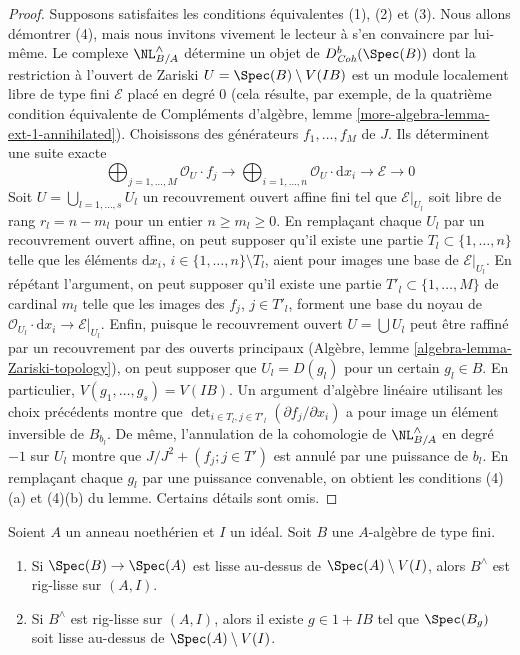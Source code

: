\begin{proof}
\medskip\noindent
Supposons satisfaites les conditions équivalentes (1), (2) et (3). Nous allons
démontrer (4), mais nous invitons vivement le lecteur à s'en convaincre par
lui-même. Le complexe $\NL_{B/A}^\wedge$ détermine un objet de
$D^b_{\textit{Coh}}(\Spec(B))$ dont la restriction à l'ouvert de Zariski
$U = \Spec(B) \setminus V(IB)$ est un module localement libre de type fini
$\mathcal{E}$ placé en degré $0$ (cela résulte, par exemple, de la quatrième
condition équivalente de Compléments d'algèbre, lemme
\ref{more-algebra-lemma-ext-1-annihilated}). Choisissons des générateurs
$f_1, \ldots, f_M$ de $J$. Ils déterminent une suite exacte
$$
\bigoplus\nolimits_{j = 1, \ldots, M} \mathcal{O}_U \cdot f_j \to
\bigoplus\nolimits_{i = 1, \ldots, n} \mathcal{O}_U \cdot \text{d}x_i \to
\mathcal{E} \to 0
$$
Soit $U = \bigcup_{l = 1, \ldots, s} U_l$ un recouvrement ouvert affine fini
tel que $\mathcal{E}|_{U_l}$ soit libre de rang $r_l = n - m_l$ pour un entier
$n \geq m_l \geq 0$. En remplaçant chaque $U_l$ par un recouvrement ouvert
affine, on peut supposer qu'il existe une partie
$T_l \subset \{1, \ldots, n\}$ telle que les éléments $\text{d}x_i$,
$i \in \{1, \ldots, n\} \setminus T_l$, aient pour images une base de
$\mathcal{E}|_{U_l}$. En répétant l'argument, on peut supposer qu'il existe une
partie $T'_l \subset \{1, \ldots, M\}$ de cardinal $m_l$ telle que les images
des $f_j$, $j \in T'_l$, forment une base du noyau de
$\mathcal{O}_{U_l} \cdot \text{d}x_i \to \mathcal{E}|_{U_l}$. Enfin, puisque
le recouvrement ouvert $U = \bigcup U_l$ peut être raffiné par un recouvrement
par des ouverts principaux (Algèbre, lemme
\ref{algebra-lemma-Zariski-topology}), on peut supposer que
$U_l = D(g_l)$ pour un certain $g_l \in B$. En particulier,
$V(g_1, \ldots, g_s) = V(IB)$. Un argument d'algèbre linéaire utilisant les
choix précédents montre que
$\det_{i \in T_l, j \in T'_l}(\partial f_j/ \partial x_i)$
a pour image un élément inversible de $B_{b_l}$. De même, l'annulation de la
cohomologie de $\NL_{B/A}^\wedge$ en degré $-1$ sur $U_l$ montre que
$J/J^2 + (f_j; j \in T')$ est annulé par une puissance de $b_l$. En remplaçant
chaque $g_l$ par une puissance convenable, on obtient les conditions (4)(a) et
(4)(b) du lemme. Certains détails sont omis.
\end{proof}

\begin{lemma}
\label{lemma-rig-smooth}
Soient $A$ un anneau noethérien et $I$ un idéal. Soit $B$ une $A$-algèbre de
type fini.
\begin{enumerate}
\item Si $\Spec(B) \to \Spec(A)$ est lisse au-dessus de
$\Spec(A) \setminus V(I)$, alors $B^\wedge$ est rig-lisse sur $(A, I)$.
\item Si $B^\wedge$ est rig-lisse sur $(A, I)$, alors il existe
$g \in 1 + IB$ tel que $\Spec(B_g)$ soit lisse au-dessus de
$\Spec(A) \setminus V(I)$.
\end{enumerate}
\end{lemma}

